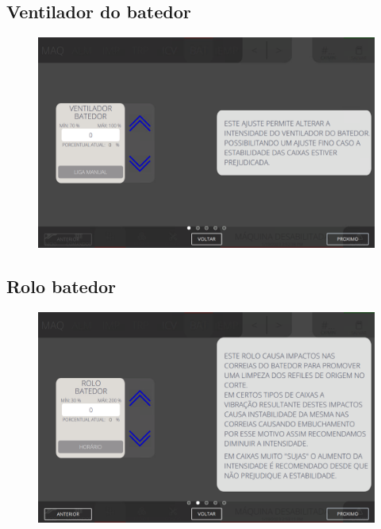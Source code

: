 \thispagestyle{fancy}
\vspace{\fill}
\subsection{\small Ventilador do batedor}
\begin{figure}
    \centering
    \includegraphics[width=480 px,height=300 px]{src/imagesICV/07-scout/settings/e-1.png}
\end{figure}

\newpage
\thispagestyle{fancy}
\vspace{\fill}
\subsection{\small Rolo batedor}
\begin{figure}
    \centering
    \includegraphics[width=576 px,height=360 px]{src/imagesICV/07-scout/settings/e-2.png}
\end{figure}

